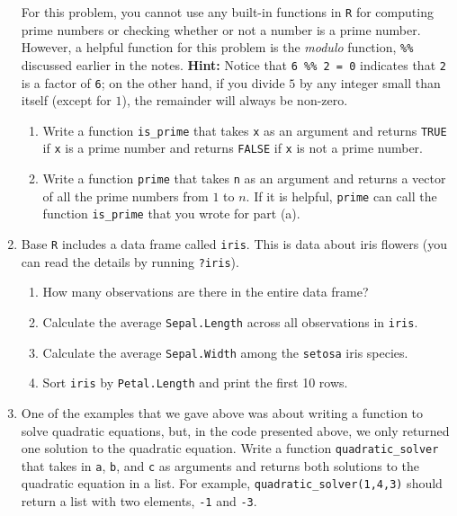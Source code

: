 \documentclass[
  letterpaper,
  DIV=11,
  numbers=noendperiod]{scrreprt}
\begin{document}
\begin{enumerate}
  For this problem, you cannot use any built-in functions in \texttt{R}
  for computing prime numbers or checking whether or not a number is a
  prime number. However, a helpful function for this problem is the
  \emph{modulo} function, \texttt{\%\%} discussed earlier in the notes.
  \textbf{Hint:} Notice that \texttt{6\ \%\%\ 2\ =\ 0} indicates that
  \texttt{2} is a factor of \texttt{6}; on the other hand, if you divide
  \(5\) by any integer small than itself (except for \(1\)), the
  remainder will always be non-zero.

  \begin{enumerate}
  \def\labelenumii{\alph{enumii})}
  \item
    Write a function \texttt{is\_prime} that takes \texttt{x} as an
    argument and returns \texttt{TRUE} if \texttt{x} is a prime number
    and returns \texttt{FALSE} if \texttt{x} is not a prime number.
  \item
    Write a function \texttt{prime} that takes \texttt{n} as an argument
    and returns a vector of all the prime numbers from \(1\) to \(n\).
    If it is helpful, \texttt{prime} can call the function
    \texttt{is\_prime} that you wrote for part (a).
  \end{enumerate}
\item
  Base \texttt{R} includes a data frame called \texttt{iris}. This is
  data about iris flowers (you can read the details by running
  \texttt{?iris}).

  \begin{enumerate}
  \def\labelenumii{\alph{enumii})}
  \item
    How many observations are there in the entire data frame?
  \item
    Calculate the average \texttt{Sepal.Length} across all observations
    in \texttt{iris}.
  \item
    Calculate the average \texttt{Sepal.Width} among the \texttt{setosa}
    iris species.
  \item
    Sort \texttt{iris} by \texttt{Petal.Length} and print the first 10
    rows.
  \end{enumerate}
\item
  One of the examples that we gave above was about writing a function to
  solve quadratic equations, but, in the code presented above, we only
  returned one solution to the quadratic equation. Write a function
  \texttt{quadratic\_solver} that takes in \texttt{a}, \texttt{b}, and
  \texttt{c} as arguments and returns both solutions to the quadratic
  equation in a list. For example, \texttt{quadratic\_solver(1,4,3)}
  should return a list with two elements, \texttt{-1} and \texttt{-3}.
\end{enumerate}
\end{document}
